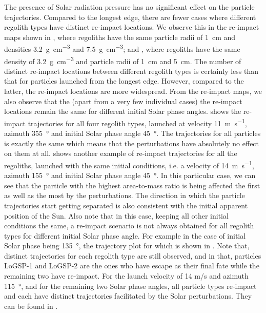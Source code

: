 The presence of Solar radiation pressure has no significant effect on the particle trajectories. Compared to the longest edge, there are fewer cases where different regolith types have distinct re-impact locations. We observe this in the re-impact maps shown in , where regoliths have the same particle radii of \SI{1}{\centi\metre} and densities \SI{3.2}{\gram\per\centi\metre\cubed} and \SI{7.5}{\gram\per\centi\metre\cubed}; and , where regoliths have the same density of \SI{3.2}{\gram\per\centi\metre\cubed} and particle radii of \SI{1}{\centi\metre} and \SI{5}{\centi\metre}. The number of distinct re-impact locations between different regolith types is certainly less than that for particles launched from the longest edge. However, compared to the latter, the re-impact locations are more widespread. From the re-impact maps, we also observe that the (apart from a very few individual cases) the re-impact locations remain the same for different initial Solar phase angles.
%
\newline\newline
%
 shows the re-impact trajectories for all four regolith types, launched at velocity \SI{11}{\metre\per\second}, azimuth \SI{355}{\degree} and initial Solar phase angle \SI{45}{\degree}. The trajectories for all particles is exactly the same which means that the perturbations have absolutely no effect on them at all.  shows another example of re-impact trajectories for all the regoliths, launched with the same initial conditions, i.e. a velocity of \SI{14}{\metre\per\second}, azimuth \SI{155}{\degree} and initial Solar phase angle \SI{45}{\degree}. In this particular case, we can see that the particle with the highest area-to-mass ratio is being affected the first as well as the most by the perturbations. The direction in which the particle trajectories start getting separated is also consistent with the initial apparent position of the Sun. Also note that in this case, keeping all other initial conditions the same, a re-impact scenario is not always obtained for all regolith types for different initial Solar phase angle. For example in the case of initial Solar phase being \SI{135}{\degree}, the trajectory plot for which is shown in . Note that, distinct trajectories for each regolith type are still observed, and in that, particles LoGSP-1 and LoGSP-2 are the ones who have escape as their final fate while the remaining two have re-impact. For the launch velocity of 14 m/s and azimuth \SI{115}{\degree}, and for the remaining two Solar phase angles, all particle types re-impact and each have distinct trajectories facilitated by the Solar perturbations. They can be found in .

